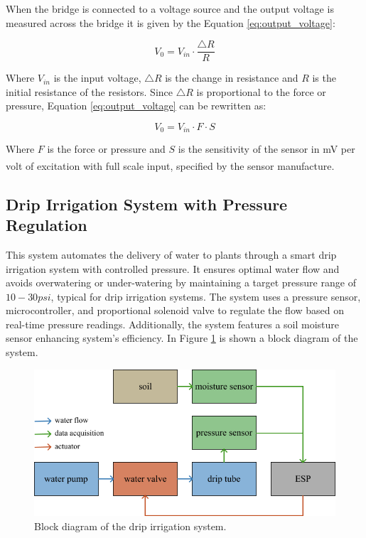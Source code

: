 When the bridge is connected to a voltage source and the output voltage is measured across the bridge it is given by the Equation \ref{eq:output_voltage}:

\begin{equation}
    V_0 = V_{in}\cdot \frac{\triangle R}{R}
    \label{eq:output_voltage}
\end{equation}

Where $V_{in}$ is the input voltage, $\triangle R$ is the change in resistance and $R$ is the initial resistance of the resistors. Since $\triangle R$ is proportional to the force or pressure, Equation \ref{eq:output_voltage}
can be rewritten as:

\begin{equation}
    V_0 = V_{in}\cdot F \cdot S
    \label{eq:output_voltage_force}
\end{equation}

Where $F$ is the force or pressure and $S$ is the sensitivity of the sensor in mV per volt of excitation with full scale input, specified by the sensor manufacture\textsuperscript{\cite{TI-Design-Signal-Conditioning-Wheatstone-Resistive-Bridge-Sensors}}.

\subsection{Drip Irrigation System with Pressure Regulation}

This system automates the delivery of water to plants through a smart drip irrigation system with controlled pressure. It ensures optimal water flow and avoids overwatering or under-watering by maintaining a target pressure range of $10-30 psi$, typical for drip irrigation systems. The system uses a pressure sensor, microcontroller, and proportional solenoid valve to regulate the flow based on real-time pressure readings. Additionally, the system features a soil moisture sensor enhancing system's efficiency. In Figure \ref{fig:block-diagram} is shown a block diagram of the system.

\begin{figure}[H]
    \centering
    \includegraphics*[scale = 0.5]{images/block-diagram.png}
    \caption{Block diagram of the drip irrigation system.} 
    \label{fig:block-diagram}
\end{figure}

